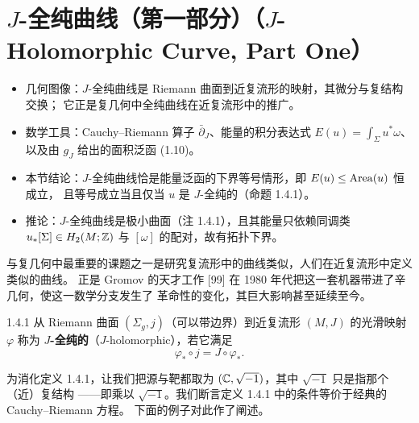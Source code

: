 \section{$J$-全纯曲线（第一部分）（$J$-Holomorphic Curve, Part One）}

\begin{keytakeaways}
\begin{itemize}
  \item 几何图像：$J$-全纯曲线是 Riemann 曲面到近复流形的映射，其微分与复结构交换；
        它正是复几何中全纯曲线在近复流形中的推广。
  \item 数学工具：Cauchy--Riemann 算子 $\bar\partial_J$、能量的积分表达式
        $E(u)=\int_\Sigma u^*\omega$、以及由 $g_J$ 给出的面积泛函 (1.10)。
  \item 本节结论：$J$-全纯曲线恰是能量泛函的下界等号情形，即 $E(u)\le\operatorname{Area}(u)$ 恒成立，
        且等号成立当且仅当 $u$ 是 $J$-全纯的（命题 1.4.1）。
  \item 推论：$J$-全纯曲线是极小曲面（注 1.4.1），且其能量只依赖同调类
        $u_*[\Sigma]\in H_2(M;\mathbb{Z})$ 与 $[\omega]$ 的配对，故有拓扑下界。
\end{itemize}
\end{keytakeaways}

与复几何中最重要的课题之一是研究复流形中的曲线类似，人们在近复流形中定义类似的曲线。
正是 Gromov 的天才工作 [99] 在 1980 年代把这一套机器带进了辛几何，使这一数学分支发生了
革命性的变化，其巨大影响甚至延续至今。

\begin{wdefn}{1.4.1}
从 Riemann 曲面 $(\Sigma_g,j)$（可以带边界）到近复流形 $(M,J)$ 的光滑映射 $\varphi$
称为 \textbf{$J$-全纯的}（$J$-holomorphic），若它满足
\[
  \varphi_*\circ j=J\circ\varphi_* .
\]
\end{wdefn}

为消化定义 1.4.1，让我们把源与靶都取为 $(\mathbb{C},\sqrt{-1})$，其中 $\sqrt{-1}$ 只是指那个（近）复结构
——即乘以 $\sqrt{-1}$。我们断言定义 1.4.1 中的条件等价于经典的 Cauchy--Riemann 方程。
下面的例子对此作了阐述。

